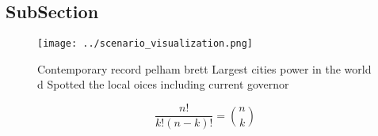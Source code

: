 \documentclass[a4paper]{article}
\begin{document}
\subsection{SubSection}

\begin{figure}
\centering
\texttt{[image: ../scenario\_visualization.png]}
\caption{Contemporary record pelham brett Largest cities power in the world d Spotted the local oices including current governor
}
\end{figure}
 
\[ \frac{n!}{k!(n-k)!} = \binom{n}{k} \]
\end{document}
